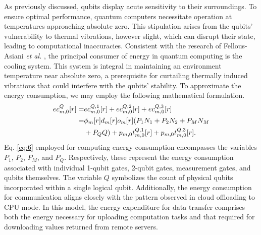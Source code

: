 \documentclass[journal]{IEEEtran}
\begin{document}
As previously discussed, qubits display acute sensitivity to their surroundings.
To ensure optimal performance, quantum computers necessitate operation at temperatures approaching absolute zero.
This stipulation arises from the qubits' vulnerability to thermal vibrations, however slight, which can disrupt their state, leading to computational inaccuracies.
Consistent with the research of Fellous-Asiani {\em et al.} \cite{fellous2022optimizing}, the principal consumer of energy in quantum computing is the cooling system.
This system is integral in maintaining an environment temperature near absolute zero, a prerequisite for curtailing thermally induced vibrations that could interfere with the qubits' stability.
To approximate the energy consumption, we may employ the following  mathematical formulation.
\begin{align}\label{eq:6}
ec_{m,0}^Q[r]=&ec_{m,0}^{Q,1}[r]+ec_{m,0}^{Q,2}[r]+ec_{m,0}^{Q,3}[r]\notag\\
=&\phi_m[r]d_m[r]o_m[r](P_1N_1+P_2N_2+P_MN_M\notag\\
&+P_QQ)+p_{m,0}t_{m,0}^{Q,1}[r]+p_{m,0}t_{m,0}^{Q,3}[r].
\end{align}
Eq. \eqref{eq:6} employed for computing energy consumption encompasses the variables $P_1$, $P_2$, $P_M$, and $P_Q$.
Respectively, these represent the energy consumption associated with individual 1-qubit gates, 2-qubit gates, measurement gates, and qubits themselves.
The variable $Q$ symbolizes the count of physical qubits incorporated within a single logical qubit.
Additionally, the energy consumption for communication aligns closely with the pattern observed in cloud offloading to CPU mode.
In this model, the energy expenditure for data transfer comprises both the energy necessary for uploading computation tasks and that required for downloading values returned from remote servers.
\end{document}

